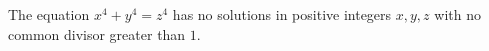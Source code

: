 The equation $x^4 + y^4 = z^4$ has no solutions in positive integers $x, y, z$ with no common divisor greater than $1$.
